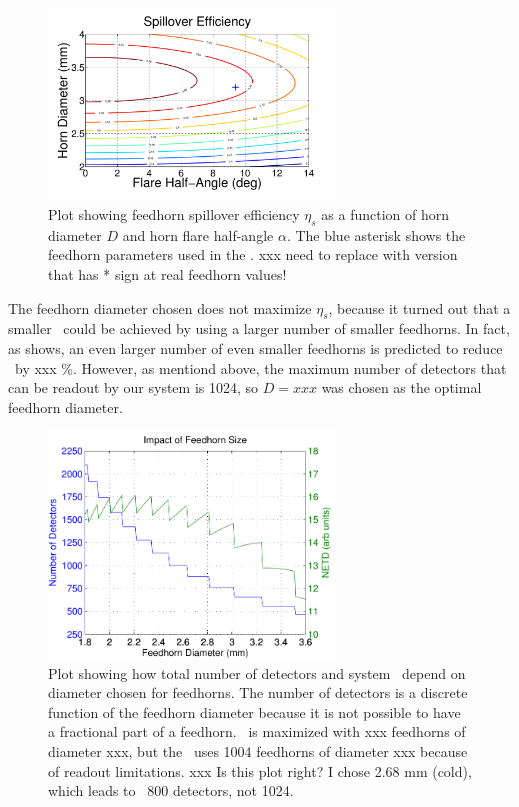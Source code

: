 \begin{figure}
\centering
\includegraphics[width=3.0in]{./images/spill_vs_alpha_diam.pdf}
\caption{Plot showing feedhorn spillover efficiency $\eta_s$ as a function of horn diameter $D$ and horn flare half-angle $\alpha$. The blue asterisk shows the feedhorn parameters used in the \Imager. xxx need to replace with version that has * sign at real feedhorn values!}
\label{fig:spill-vs-alpha-diam}
\end{figure}

The feedhorn diameter chosen does not maximize $\eta_s$, because it turned out that a smaller \NETD\ could be achieved by using a larger number of smaller feedhorns.
In fact, as  shows, an even larger number of even smaller feedhorns is predicted to reduce \NETD\ by xxx \%.
However, as mentiond above, the maximum number of detectors that can be readout by our system is 1024, so $D = xxx$ was chosen as the optimal feedhorn diameter.

\begin{figure}
\centering
\includegraphics[width=3.0in]{./images/netd_num_feeds.pdf}
\caption{Plot showing how total number of detectors and system \NETD\ depend on diameter chosen for feedhorns. The number of detectors is a discrete function of the feedhorn diameter because it is not possible to have a fractional part of a feedhorn. \NETD\ is maximized with xxx feedhorns of diameter xxx, but the \Imager\ uses 1004 feedhorns of diameter xxx because of readout limitations. xxx Is this plot right? I chose 2.68 mm (cold), which leads to ~800 detectors, not 1024.}
\label{fig:netd-num-feeds}
\end{figure}

